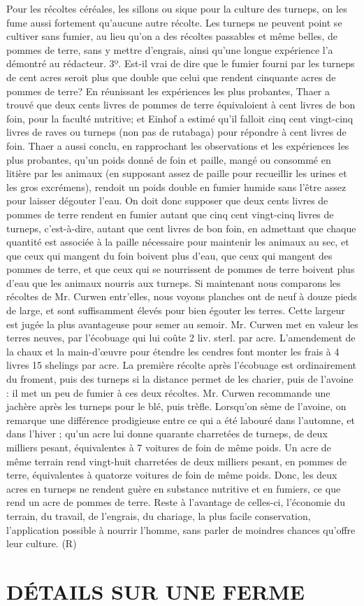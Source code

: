 Pour les récoltes céréales, les sillons ou sique pour la culture des turneps, on les fume aussi fortement qu'aucune autre récolte. Les turneps ne peuvent point se cultiver sans fumier, au lieu qu'on a des récoltes passables et même belles, de pommes de terre, sans y mettre d'engrais, ainsi qu'une longue expérience l'a démontré au rédacteur. 3º. Est-il vrai de dire que le fumier fourni par les turneps de cent acres seroit plus que double que celui que rendent cinquante acres de pommes de terre? En réunissant les expériences les plus probantes, Thaer a trouvé que deux cents livres de pommes de terre équivaloient à cent livres de bon foin, pour la faculté nutritive; et Einhof a estimé qu'il falloit cinq cent vingt-cinq livres de raves ou turneps (non pas de rutabaga) pour répondre à cent livres de foin. Thaer a aussi conclu, en rapprochant les observations et les expériences les plus probantes, qu'un poids donné de foin et paille, mangé ou consommé en litière par les animaux (en supposant assez de paille pour recueillir les urines et les gros excrémens), rendoit un poids double en fumier humide sans l'être assez pour laisser dégouter l'eau. On doit donc supposer que deux cents livres de pommes de terre rendent en fumier autant que cinq cent vingt-cinq livres de turneps, c'est-à-dire, autant que cent livres de bon foin, en admettant que chaque quantité est associée à la paille nécessaire pour maintenir les animaux au sec, et que ceux qui mangent du foin boivent plus d'eau, que ceux qui mangent des pommes de terre, et que ceux qui se nourrissent de pommes de terre boivent plus d'eau que les animaux nourris aux turneps. Si maintenant nous comparons les récoltes de Mr. Curwen entr'elles, nous voyons\setcounter{page}{216} planches ont de neuf à douze pieds de large, et sont suffisamment élevés pour bien égouter les terres. Cette largeur est jugée la plus avantageuse pour semer au semoir.
Mr. Curwen met en valeur les terres neuves, par l'écobuage qui lui coûte 2 liv. sterl. par acre. L'amendement de la chaux et la main-d'œuvre pour étendre les cendres font monter les frais à 4 livres 15 shelings par acre.
La première récolte après l'écobuage est ordinairement du froment, puis des turneps si la distance permet de les charier, puis de l'avoine : il met un peu de fumier à ces deux récoltes.
Mr. Curwen recommande une jachère après les turneps pour le blé, puis trèfle.
Lorsqu'on sème de l'avoine, on remarque une différence prodigieuse entre ce qui a été labouré dans l'automne, et dans l'hiver ;
qu'un acre lui donne quarante charretées de turneps, de deux milliers pesant, équivalentes à 7 voitures de foin de même poids. Un acre de même terrain rend vingt-huit charretées de deux milliers pesant, en pommes de terre, équivalentes à quatorze voitures de foin de même poids. Donc, les deux acres en turneps ne rendent guère en substance nutritive et en fumiers, ce que rend un acre de pommes de terre. Reste à l'avantage de celles-ci, l'économie du terrain, du travail, de l'engrais, du chariage, la plus facile conservation, l'application possible à nourrir l'homme, sans parler de moindres chances qu'offre leur culture. (R)\setcounter{page}{217} \section{DÉTAILS SUR UNE FERME}
